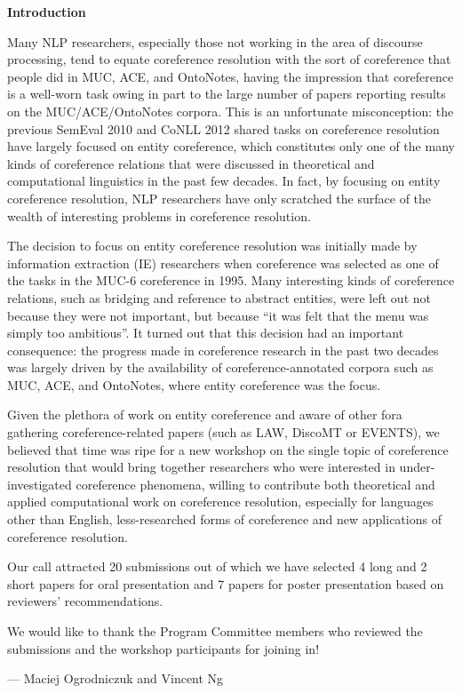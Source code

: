 \documentclass[11pt]{article}
\begin{document}
\begin{center}
  {\Large \bf Introduction}
\end{center}

\vspace*{0.5cm}


Many NLP researchers, especially those not working in the area of discourse processing, tend to equate coreference resolution with the sort of coreference that people did in MUC, ACE, and OntoNotes, having the impression that coreference is a well-worn task owing in part to the large number of papers reporting results on the MUC/ACE/OntoNotes corpora. This is an unfortunate misconception: the previous SemEval 2010 and CoNLL 2012 shared tasks on coreference resolution have largely focused on entity coreference, which constitutes only one of the many kinds of coreference relations that were discussed in theoretical and computational linguistics in the past few decades. In fact, by focusing on entity coreference resolution, NLP researchers have only scratched the surface of the wealth of interesting problems in coreference resolution.

The decision to focus on entity coreference resolution was initially made by information extraction (IE) researchers when coreference was selected as one of the tasks in the MUC-6 coreference in 1995. Many interesting kinds of coreference relations, such as bridging and reference to abstract entities, were left out not because they were not important, but because “it was felt that the menu was simply too ambitious”. It turned out that this decision had an important consequence: the progress made in coreference research in the past two decades was largely driven by the availability of coreference-annotated corpora such as MUC, ACE, and OntoNotes, where entity coreference was the focus. 

Given the plethora of work on entity coreference and aware of other fora gathering coreference-related papers (such as LAW, DiscoMT or EVENTS), we believed that time was ripe for a new workshop on the single topic of coreference resolution that would bring together researchers who were interested in under-investigated coreference phenomena, willing to contribute both theoretical and applied computational work on coreference resolution, especially for languages other than English, less-researched forms of coreference and new applications of coreference resolution. 

Our call attracted 20 submissions out of which we have selected 4 long and 2 short papers for oral presentation and 7 papers for poster presentation based on reviewers' recommendations. 

We would like to thank the Program Committee members who reviewed the submissions and the workshop participants for joining in!

\begin{flushright}
--- Maciej Ogrodniczuk and Vincent Ng
\end{flushright}
\end{document}
